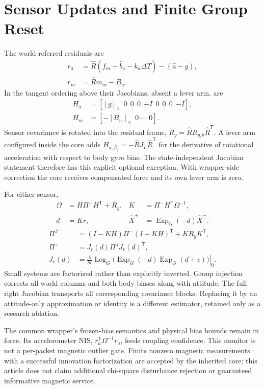 \documentclass[conference]{IEEEtran}
\newcommand{\tr}{^{\mathsf T}}
\newcommand{\sk}[1]{[#1]_\times}
\begin{document}
\section{Sensor Updates and Finite Group Reset}
\label{sec:updates}
The world-referred residuals are
\begin{align}
 r_a&=\hat R(f_m-\hat b_a-k_a\Delta T)-(\hat a-g),\\
 r_m&=\hat Rm_m-B_w.
\end{align}
In the tangent ordering above their Jacobians, absent a lever arm, are
\begin{align}
 H_a&=[\sk g\ \ 0\ \ 0\ \ 0\ \ {-I}\ \ 0\ \ 0\ \ 0\ \ {-I}],\\
 H_m&=[-\sk{B_w}\ \ 0\ \cdots\ \ 0].
\end{align}
Sensor covariance is rotated into the residual frame,
$R_y=\hat R R_{y,b}\hat R\tr$. A lever arm configured inside the core adds
$H_{a,\beta_g}=-\hat R J_L\hat R\tr$ for the derivative of rotational
acceleration with respect to body gyro bias. The state-independent Jacobian
statement therefore has this explicit optional exception. With wrapper-side
correction the core receives compensated force and its own lever arm is zero.

For either sensor,
\begin{align}
 \Omega&=H\Pi^-H\tr+R_y,&K&=\Pi^-H\tr\Omega^{-1},\\
 d&=Kr,&\hat X^+&=\operatorname{Exp}_G(-d)\hat X^-.
\end{align}
\begin{align}
 \Pi^J&=(I-KH)\Pi^-(I-KH)\tr+KR_yK\tr,\\
 \Pi^+&=J_r(d)\Pi^J J_r(d)\tr,\label{eq:groupreset}\\
 J_r(d)&=\left.\frac{\partial}{\partial\epsilon}
 \operatorname{Log}_G\bigl(\operatorname{Exp}_G(-d)
                \operatorname{Exp}_G(d+\epsilon)\bigr)\right|_0.
\end{align}
Small systems are factorized rather than explicitly inverted. Group injection
corrects all world columns and both body biases along with attitude. The full
right Jacobian transports all corresponding covariance blocks. Replacing it
by an attitude-only approximation or identity is a different estimator,
retained only as a research ablation.

The common wrapper's frozen-bias semantics and physical bias bounds remain
in force. Its accelerometer NIS, $r_a\tr\Omega^{-1}r_a$, feeds coupling
confidence. This monitor is not a per-packet magnetic outlier gate. Finite
nonzero magnetic measurements with a successful innovation factorization are
accepted by the inherited core; this article does not claim additional
chi-square disturbance rejection or guaranteed informative magnetic service.
\end{document}
